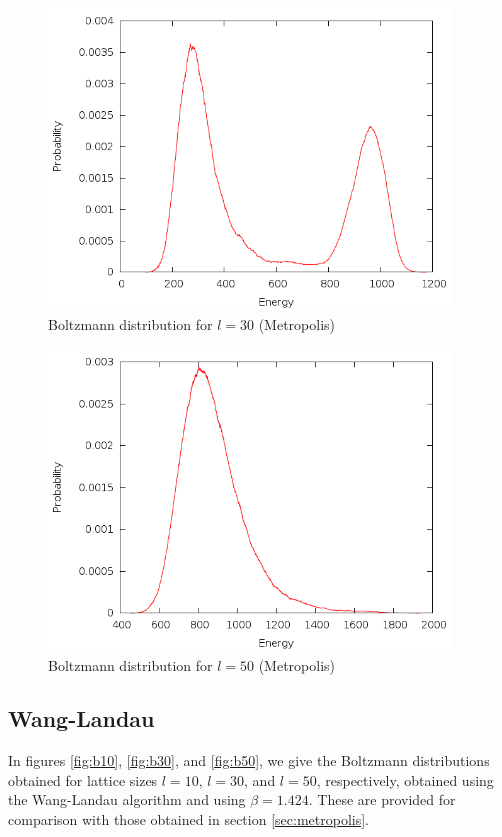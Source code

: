 \documentclass{article}
\begin{document}
\begin{figure}[h]
\includegraphics[height=8cm]{../results/metropolis/m30.png}
\caption{Boltzmann distribution for $l = 30$ (Metropolis)}
\label{fig:m30}
\end{figure}

\begin{figure}[h]
\includegraphics[height=8cm]{../results/metropolis/m50.png}
\caption{Boltzmann distribution for $l = 50$ (Metropolis)}
\label{fig:m50}
\end{figure}

\subsection{Wang-Landau}
In figures \ref{fig:b10}, \ref{fig:b30}, and \ref{fig:b50}, we give the Boltzmann distributions obtained for lattice sizes $l = 10$, $l = 30$, and $l = 50$, respectively, obtained using the Wang-Landau algorithm and using $\beta = 1.424$.
These are provided for comparison with those obtained in section \ref{sec:metropolis}.
\end{document}
